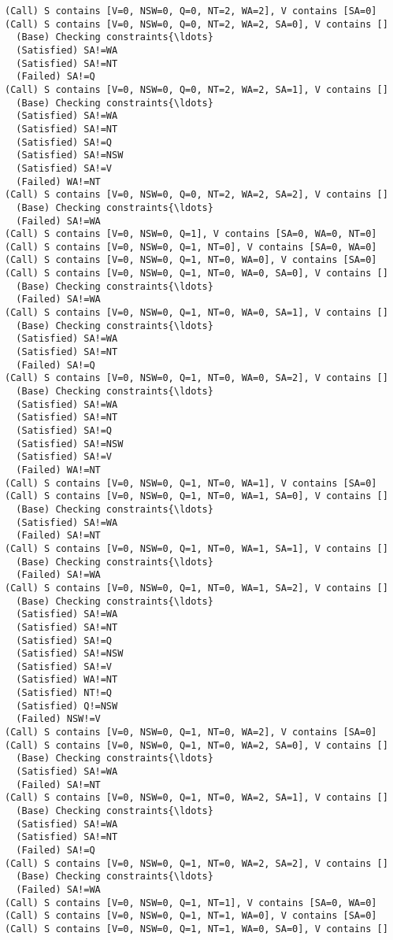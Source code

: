 \documentclass[11pt]{article}
\begin{document}
\begin{Verbatim}[commandchars=\\\{\}]
(Call) S contains [V=0, NSW=0, Q=0, NT=2, WA=2], V contains [SA=0]
(Call) S contains [V=0, NSW=0, Q=0, NT=2, WA=2, SA=0], V contains []
  (Base) Checking constraints{\ldots}
  (Satisfied) SA!=WA
  (Satisfied) SA!=NT
  (Failed) SA!=Q
(Call) S contains [V=0, NSW=0, Q=0, NT=2, WA=2, SA=1], V contains []
  (Base) Checking constraints{\ldots}
  (Satisfied) SA!=WA
  (Satisfied) SA!=NT
  (Satisfied) SA!=Q
  (Satisfied) SA!=NSW
  (Satisfied) SA!=V
  (Failed) WA!=NT
(Call) S contains [V=0, NSW=0, Q=0, NT=2, WA=2, SA=2], V contains []
  (Base) Checking constraints{\ldots}
  (Failed) SA!=WA
(Call) S contains [V=0, NSW=0, Q=1], V contains [SA=0, WA=0, NT=0]
(Call) S contains [V=0, NSW=0, Q=1, NT=0], V contains [SA=0, WA=0]
(Call) S contains [V=0, NSW=0, Q=1, NT=0, WA=0], V contains [SA=0]
(Call) S contains [V=0, NSW=0, Q=1, NT=0, WA=0, SA=0], V contains []
  (Base) Checking constraints{\ldots}
  (Failed) SA!=WA
(Call) S contains [V=0, NSW=0, Q=1, NT=0, WA=0, SA=1], V contains []
  (Base) Checking constraints{\ldots}
  (Satisfied) SA!=WA
  (Satisfied) SA!=NT
  (Failed) SA!=Q
(Call) S contains [V=0, NSW=0, Q=1, NT=0, WA=0, SA=2], V contains []
  (Base) Checking constraints{\ldots}
  (Satisfied) SA!=WA
  (Satisfied) SA!=NT
  (Satisfied) SA!=Q
  (Satisfied) SA!=NSW
  (Satisfied) SA!=V
  (Failed) WA!=NT
(Call) S contains [V=0, NSW=0, Q=1, NT=0, WA=1], V contains [SA=0]
(Call) S contains [V=0, NSW=0, Q=1, NT=0, WA=1, SA=0], V contains []
  (Base) Checking constraints{\ldots}
  (Satisfied) SA!=WA
  (Failed) SA!=NT
(Call) S contains [V=0, NSW=0, Q=1, NT=0, WA=1, SA=1], V contains []
  (Base) Checking constraints{\ldots}
  (Failed) SA!=WA
(Call) S contains [V=0, NSW=0, Q=1, NT=0, WA=1, SA=2], V contains []
  (Base) Checking constraints{\ldots}
  (Satisfied) SA!=WA
  (Satisfied) SA!=NT
  (Satisfied) SA!=Q
  (Satisfied) SA!=NSW
  (Satisfied) SA!=V
  (Satisfied) WA!=NT
  (Satisfied) NT!=Q
  (Satisfied) Q!=NSW
  (Failed) NSW!=V
(Call) S contains [V=0, NSW=0, Q=1, NT=0, WA=2], V contains [SA=0]
(Call) S contains [V=0, NSW=0, Q=1, NT=0, WA=2, SA=0], V contains []
  (Base) Checking constraints{\ldots}
  (Satisfied) SA!=WA
  (Failed) SA!=NT
(Call) S contains [V=0, NSW=0, Q=1, NT=0, WA=2, SA=1], V contains []
  (Base) Checking constraints{\ldots}
  (Satisfied) SA!=WA
  (Satisfied) SA!=NT
  (Failed) SA!=Q
(Call) S contains [V=0, NSW=0, Q=1, NT=0, WA=2, SA=2], V contains []
  (Base) Checking constraints{\ldots}
  (Failed) SA!=WA
(Call) S contains [V=0, NSW=0, Q=1, NT=1], V contains [SA=0, WA=0]
(Call) S contains [V=0, NSW=0, Q=1, NT=1, WA=0], V contains [SA=0]
(Call) S contains [V=0, NSW=0, Q=1, NT=1, WA=0, SA=0], V contains []

\end{Verbatim}
\end{document}
